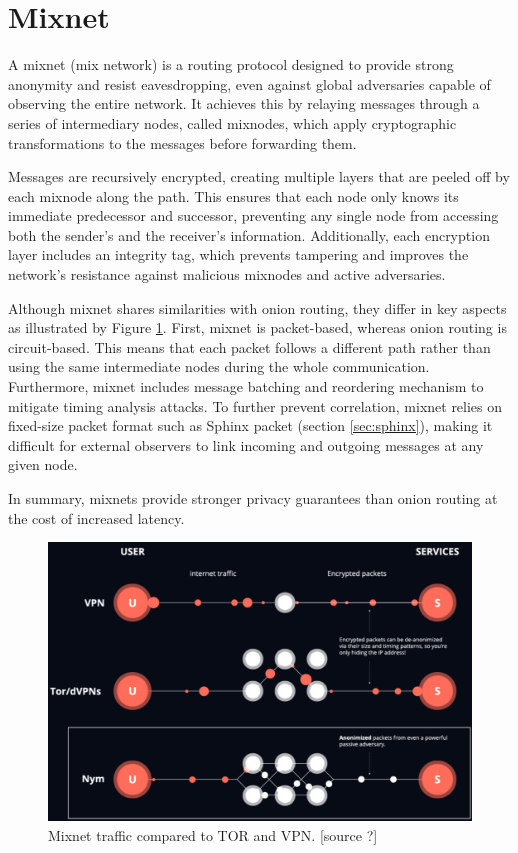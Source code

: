 \section{Mixnet}

A mixnet (mix network) is a routing protocol designed to provide strong anonymity and resist eavesdropping, even against global adversaries capable of observing the entire network. 
It achieves this by relaying messages through a series of intermediary nodes, called mixnodes, which apply cryptographic transformations to the messages before forwarding them.


Messages are recursively encrypted, creating multiple layers that are peeled off by each mixnode along the path. 
This ensures that each node only knows its immediate predecessor and successor, preventing any single node from accessing both the sender's and the receiver's information. 
Additionally, each encryption layer includes an integrity tag, which prevents tampering and improves the network’s resistance against malicious mixnodes and active adversaries.

Although mixnet shares similarities with onion routing, they differ in key aspects as illustrated by Figure \ref{fig:mixnet_traffic}.
First, mixnet is packet-based, whereas onion routing is circuit-based. 
This means that each packet follows a different path rather than using the same intermediate nodes during the whole communication.
Furthermore, mixnet includes message batching and reordering mechanism to mitigate timing analysis attacks. 
To further prevent correlation, mixnet relies on fixed-size packet format such as Sphinx packet (section \ref{sec:sphinx}), making it difficult for external observers to link incoming and outgoing messages at any given node.

In summary, mixnets provide stronger privacy guarantees than onion routing at the cost of increased latency.

\begin{figure}[h]
    \centering
    \includegraphics[width=\linewidth]{Images/mixnet_traffic.png}
    \caption{Mixnet traffic compared to TOR and VPN. [source ?]}
    \label{fig:mixnet_traffic}
\end{figure}